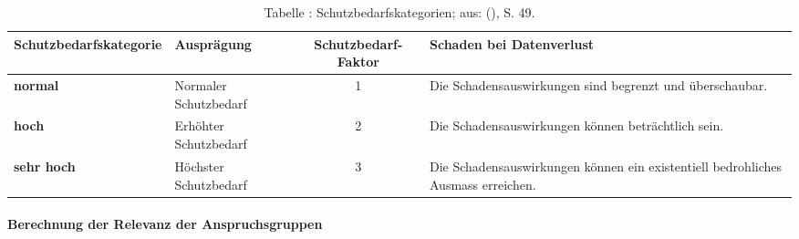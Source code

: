 \documentclass[../../main.tex]{subfiles}
\begin{document}
\addtocounter{table}{1}
\begin{table}[H]
\centering
\tablefontsize	
\caption*{Tabelle \thetable: Schutzbedarfskategorien; aus: \citeauthor{bsi_bsi-standard_2008} (\citeyear{bsi_bsi-standard_2008}), S. 49.}
\label{schutzbedarfskategorien}


\begin{tabular}{ |p{3.5cm}|p{3cm}|c|p{6cm} |}


\hline
\tableheaderbgcolor
\textbf{Schutzbedarfskategorie} & \textbf{Ausprägung} & \textbf{Schutzbedarf-\newline Faktor} & \textbf{Schaden bei Datenverlust}\\ 
\hline


\textbf{normal} & Normaler Schutzbedarf & 1 & Die Schadensauswirkungen sind begrenzt und überschaubar. \\ \hline
\textbf{hoch} & Erhöhter Schutzbedarf & 2 & Die Schadensauswirkungen können beträchtlich sein. \\ \hline
\textbf{sehr hoch} & Höchster Schutzbedarf & 3 & Die Schadensauswirkungen können ein existentiell bedrohliches Ausmass erreichen.\\ \hline

\end{tabular}
\end{table}


\paragraph*{Berechnung der Relevanz der Anspruchsgruppen}\mbox{}
\end{document}

